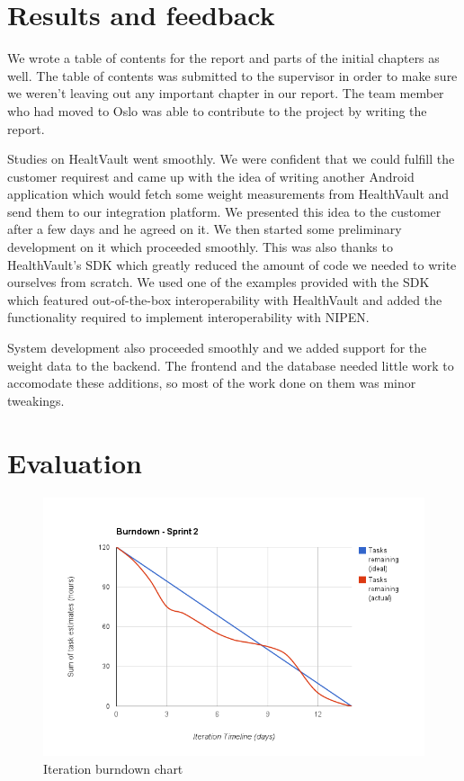 \section{Results and feedback}

We wrote a table of contents for the report and parts of the initial chapters as well.
The table of contents was submitted to the supervisor in order to make sure we weren't leaving out
any important chapter in our report. The team member who had moved to Oslo was able to contribute
to the project by writing the report.

Studies on HealtVault went smoothly. We were confident that we could fulfill the customer requirest
and came up with the idea of writing another Android application which would fetch some weight
measurements from HealthVault and send them to our integration platform.
We presented this idea to the customer after a few days and he agreed on it.
We then started some preliminary development on it which proceeded smoothly.
This was also thanks to HealthVault's SDK which greatly reduced the amount of code we needed
to write ourselves from scratch. We used one of the examples provided with the SDK which featured
out-of-the-box interoperability with HealthVault and added the functionality required to implement
interoperability with NIPEN.

System development also proceeded smoothly and we added support for the weight data to the backend.
The frontend and the database needed little work to accomodate these additions, so most of the work done on
them was minor tweakings.

\section{Evaluation}

\begin{figure}
\centering
\includegraphics[scale=0.60]{../Figures/burndownSprint2.png}
\caption{Iteration burndown chart}
\label{figure:burndownsprint2}
\end{figure}

